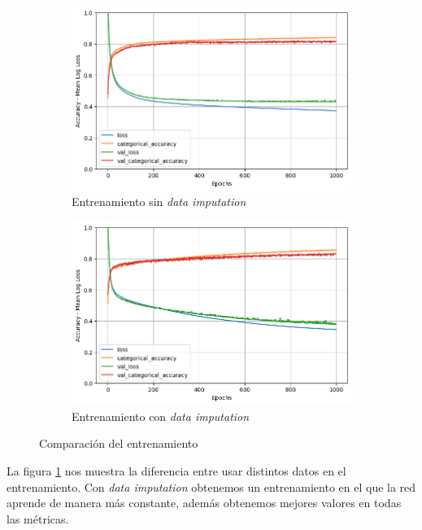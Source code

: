 \documentclass{article}
\begin{document}
			\begin{figure}[!h]
				\centering
     			\begin{subfigure}[b]{0.4\textwidth}
         			\centering
         			\includegraphics[scale=0.3]{d-tr-a1-e2}
         		\caption{Entrenamiento sin \textit{data imputation}}
         		\end{subfigure}
         		\hfill
     			\begin{subfigure}[b]{0.4\textwidth}
       				\centering
         			\includegraphics[scale=0.3]{d-tr-a1-e2-di}
         			\caption{Entrenamiento con \textit{data imputation}}
    		 	\end{subfigure}
    		 	\caption{Comparaci\'on del entrenamiento}
    		 	\label{d-s-tr-dp-1}
			\end{figure}
			La figura \ref{d-s-tr-dp-1} nos muestra la diferencia entre usar distintos datos en el entrenamiento. Con \textit{data imputation} obtenemos un entrenamiento en el que la red aprende de manera m\'as constante, adem\'as obtenemos mejores valores en todas las m\'etricas.
			
\end{document}
